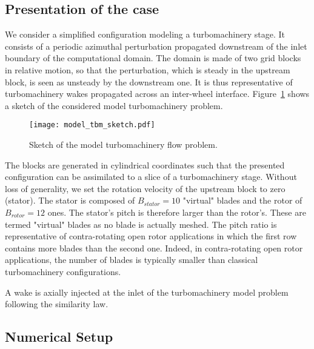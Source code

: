 
\subsection{Presentation of the case}

We consider a simplified 
configuration modeling a turbomachinery 
stage. It consists of a 
periodic azimuthal perturbation propagated downstream 
of the inlet boundary of the computational domain. 
The domain is made of two grid blocks in relative 
motion, so that the perturbation, which is steady 
in the upstream block, is seen as unsteady by the 
downstream one.
It is thus representative of 
turbomachinery wakes propagated across an inter-wheel interface.
Figure~\ref{fig:model_tbm_sketch} shows a sketch
of the considered model turbomachinery problem.
\begin{figure}[htp]
  \centering
  \texttt{[image: model\_tbm\_sketch.pdf]}
  \caption{Sketch of the model turbomachinery flow problem.}
  \label{fig:model_tbm_sketch}
\end{figure}

The blocks are generated in cylindrical
coordinates such that the presented configuration
can be assimilated to a slice of 
a turbomachinery stage.
Without loss of generality, 
we set the rotation velocity of the upstream block to zero (stator). 
The stator is composed of $B_{stator} = 10$
"virtual" blades and the rotor of $B_{rotor} = 12$ ones.
The stator's pitch is therefore larger than the rotor's.
These are termed "virtual" blades as no blade is actually meshed.
The pitch ratio is representative of 
contra-rotating open rotor applications in which 
the first row contains more blades 
than the second one. Indeed, in
contra-rotating open rotor applications, the number
of blades is typically smaller than classical
turbomachinery configurations.

A wake is axially injected at the inlet of the
turbomachinery model problem following the \citet{Lakshminarayana1980}
similarity law.



\subsection{Numerical Setup}

